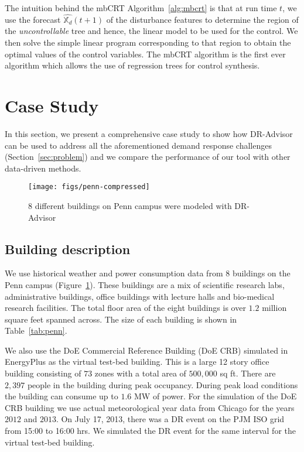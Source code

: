 \documentclass{sig-alternate-ipsn13}
\theoremstyle{definition}
\begin{document}
The intuition behind the mbCRT Algorithm~\ref{alg:mbcrt} is that at run time $t$, we use the forecast $\hat{\mathbb{X}_d}(t+1)$ of the disturbance features to determine the region of the \textit{uncontrollable} tree and hence, the linear model to be used for the control.
We then solve the simple linear program corresponding to that region to obtain the optimal values of the control variables. 
The mbCRT algorithm is the first ever algorithm which allows the use of regression trees for control synthesis. 

\section{Case Study}
\label{sec:case}

In this section, we present a comprehensive case study to show how DR-Advisor can be used to address all the aforementioned demand response challenges (Section~\ref{sec:problem}) and we compare the performance of our tool with other data-driven methods. 

\begin{figure}[b]
\centering
\texttt{[image: figs/penn-compressed]}
\caption{8 different buildings on Penn campus were modeled with DR-Advisor}
\label{fig:penn}
\end{figure}

\subsection{Building description}
We use historical weather and power consumption data from 8 buildings on the Penn campus (Figure~\ref{fig:penn}). These buildings are a mix of scientific research labs, administrative buildings, office buildings with lecture halls and bio-medical research facilities. The total floor area of the eight buildings is over $1.2$ million square feet spanned across. The size of each building is shown in Table~\ref{tab:penn}.

We also use the DoE Commercial Reference Building (DoE CRB) simulated in EnergyPlus as the virtual test-bed building.
This is a large 12 story office building consisting of $73$ zones with a total area of $500,000$ sq ft. 
There are ~$2,397$ people in the building during peak occupancy. 
During peak load conditions the building can consume up to $1.6$ MW of power. 
For the simulation of the DoE CRB building we use actual meteorological year data from Chicago for the years $2012$ and $2013$. 
On July 17, 2013, there was a DR event on the PJM ISO grid from 15:00 to 16:00 hrs. We simulated the DR event for the same interval for the virtual test-bed building.
\end{document}
